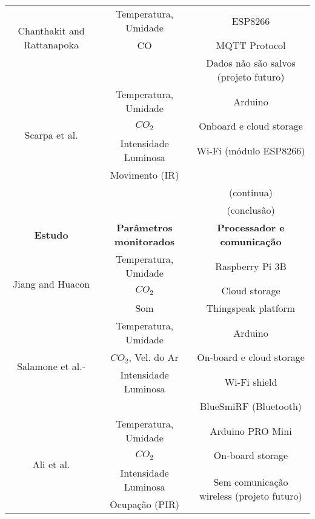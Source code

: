 \documentclass[../monografia.tex]{subfiles}
\begin{document}
\begin{center}
\begin{longtable}{ c c c }
\hline %
\multirow{3}{8em}{Chanthakit and Rattanapoka\cite{Chanthakit2018}} & Temperatura, Umidade & ESP8266 \\  %
& CO & MQTT Protocol \\ 
&  & \multirow{2}{12em}{Dados não são salvos (projeto futuro)} \\ 
& & \\

\hline %
\multirow{4}{8em}{Scarpa et al.\cite{SCARPA2017282}} & Temperatura, Umidade & Arduino \\ 
& $CO_{2}$ & Onboard e cloud storage \\ 
& Intensidade Luminosa & Wi-Fi (módulo ESP8266) \\ 
& Movimento (IR)  &\\

 & & (continua) \\ 

\pagebreak

& &	(conclusão) \\ 

\toprule
\textbf{Estudo} & \textbf{Parâmetros monitorados} & \textbf{Processador e comunicação} \\

\hline %
\multirow{3}{8em}{Jiang and Huacon\cite{Jiang2017}} & Temperatura, Umidade & Raspberry Pi 3B \\ 
& $CO_{2}$ & Cloud storage \\ 
& Som & Thingspeak platform \\ 

\hline %
\multirow{4}{8em}{Salamone et al.\cite{SALAMONE2017351}-\cite{Salamone2017}} & Temperatura, Umidade & Arduino \\ 
& $CO_{2}$, Vel. do Ar & On-board e cloud storage \\ 
& Intensidade Luminosa & Wi-Fi shield \\ 
&  & BlueSmiRF (Bluetooth) \\ 

\hline %
\multirow{4}{8em}{Ali et al.\cite{ALI2016114}} & Temperatura, Umidade & Arduino PRO Mini \\
& $CO_{2}$ & On-board storage \\ 
& Intensidade Luminosa & \multirow{2}{12em}{Sem comunicação wireless (projeto futuro)} \\ 
& Ocupação (PIR) &  \\ 


\end{longtable}
\end{center}
\end{document}
